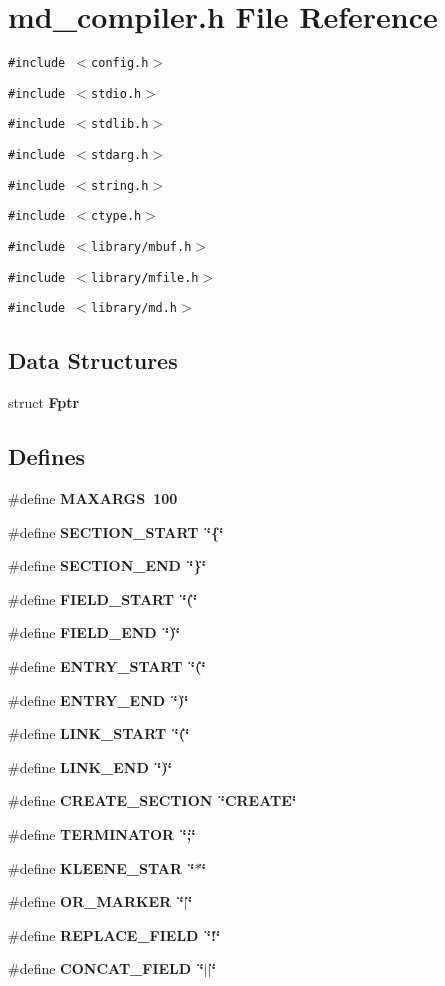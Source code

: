 \section{md\_\-compiler.h File Reference}
\label{md__compiler_8h}
{\tt \#include $<$config.h$>$}\par
{\tt \#include $<$stdio.h$>$}\par
{\tt \#include $<$stdlib.h$>$}\par
{\tt \#include $<$stdarg.h$>$}\par
{\tt \#include $<$string.h$>$}\par
{\tt \#include $<$ctype.h$>$}\par
{\tt \#include $<$library/mbuf.h$>$}\par
{\tt \#include $<$library/mfile.h$>$}\par
{\tt \#include $<$library/md.h$>$}\par
\subsection*{Data Structures}
\begin{CompactItemize}
\item 
struct \bf{Fptr}
\end{CompactItemize}
\subsection*{Defines}
\begin{CompactItemize}
\item 
\#define \bf{MAXARGS}~100
\item 
\#define \bf{SECTION\_\-START}~\char`\"{}\{\char`\"{}
\item 
\#define \bf{SECTION\_\-END}~\char`\"{}\}\char`\"{}
\item 
\#define \bf{FIELD\_\-START}~\char`\"{}(\char`\"{}
\item 
\#define \bf{FIELD\_\-END}~\char`\"{})\char`\"{}
\item 
\#define \bf{ENTRY\_\-START}~\char`\"{}(\char`\"{}
\item 
\#define \bf{ENTRY\_\-END}~\char`\"{})\char`\"{}
\item 
\#define \bf{LINK\_\-START}~\char`\"{}(\char`\"{}
\item 
\#define \bf{LINK\_\-END}~\char`\"{})\char`\"{}
\item 
\#define \bf{CREATE\_\-SECTION}~\char`\"{}CREATE\char`\"{}
\item 
\#define \bf{TERMINATOR}~\char`\"{};\char`\"{}
\item 
\#define \bf{KLEENE\_\-STAR}~\char`\"{}$\ast$\char`\"{}
\item 
\#define \bf{OR\_\-MARKER}~\char`\"{}$|$\char`\"{}
\item 
\#define \bf{REPLACE\_\-FIELD}~\char`\"{}!\char`\"{}
\item 
\#define \bf{CONCAT\_\-FIELD}~\char`\"{}$|$$|$\char`\"{}
\end{CompactItemize}
